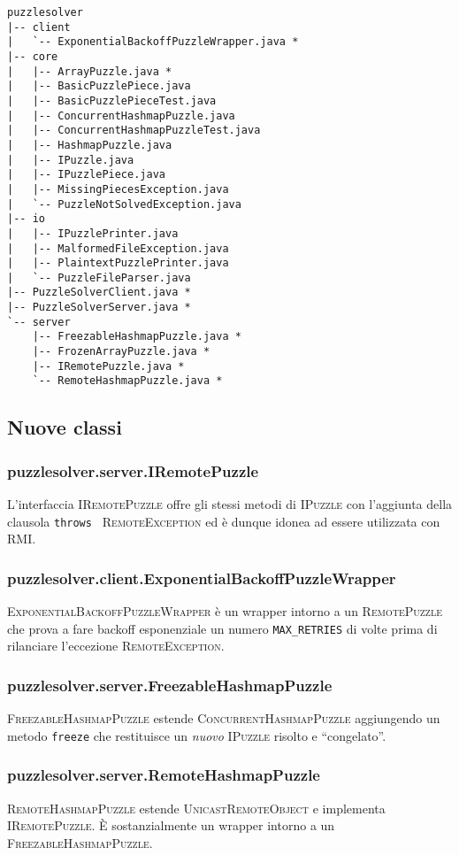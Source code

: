 \documentclass[a4paper]{article}
\newcommand{\Classname}[1]{\textsc{#1}}
\newcommand{\Ifacename}[1]{\textsc{#1}}
\newcommand{\Methodname}[1]{\texttt{#1}}
\begin{document}
\begin{verbatim}
puzzlesolver
|-- client
|   `-- ExponentialBackoffPuzzleWrapper.java *
|-- core
|   |-- ArrayPuzzle.java *
|   |-- BasicPuzzlePiece.java
|   |-- BasicPuzzlePieceTest.java
|   |-- ConcurrentHashmapPuzzle.java
|   |-- ConcurrentHashmapPuzzleTest.java
|   |-- HashmapPuzzle.java
|   |-- IPuzzle.java
|   |-- IPuzzlePiece.java
|   |-- MissingPiecesException.java
|   `-- PuzzleNotSolvedException.java
|-- io
|   |-- IPuzzlePrinter.java
|   |-- MalformedFileException.java
|   |-- PlaintextPuzzlePrinter.java
|   `-- PuzzleFileParser.java
|-- PuzzleSolverClient.java *
|-- PuzzleSolverServer.java *
`-- server
    |-- FreezableHashmapPuzzle.java *
    |-- FrozenArrayPuzzle.java *
    |-- IRemotePuzzle.java *
    `-- RemoteHashmapPuzzle.java *
\end{verbatim}

\subsection{Nuove classi}
\subsubsection{puzzlesolver.server.IRemotePuzzle}
L'interfaccia \Ifacename{IRemotePuzzle} offre gli stessi metodi di \Ifacename{IPuzzle} con l'aggiunta della clausola \texttt{throws } \Ifacename{RemoteException} ed \`e dunque idonea ad essere utilizzata con RMI.
\subsubsection{puzzlesolver.client.ExponentialBackoffPuzzleWrapper}
\Classname{ExponentialBackoffPuzzleWrapper} \`e un wrapper intorno a un \Ifacename{RemotePuzzle} che prova a fare backoff esponenziale un numero \texttt{MAX\_RETRIES} di volte prima di rilanciare l'eccezione \Classname{RemoteException}.
\subsubsection{puzzlesolver.server.FreezableHashmapPuzzle}
\Classname{FreezableHashmapPuzzle} estende \Classname{ConcurrentHashmapPuzzle} aggiungendo un metodo \Methodname{freeze} che restituisce un \emph{nuovo} \Ifacename{IPuzzle} risolto e ``congelato''.
\subsubsection{puzzlesolver.server.RemoteHashmapPuzzle}
\Classname{RemoteHashmapPuzzle} estende \Classname{UnicastRemoteObject} e implementa \Classname{IRemotePuzzle}.
\`E sostanzialmente un wrapper intorno a un \Classname{FreezableHashmapPuzzle}.
\end{document}
